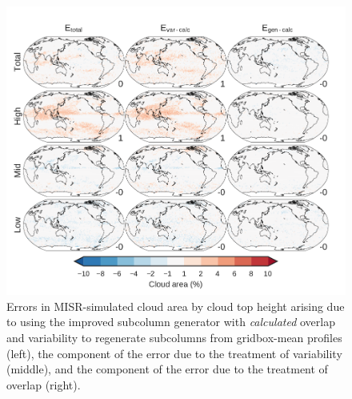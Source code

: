 \begin{figure}[htbp]
\centering
\includegraphics{graphics/subgrid2_cldmisr_maps_gen-var-calc_diff.pdf}
\caption{\label{fig:cldmisrMapsCalcDiff}Errors in MISR-simulated cloud
area by cloud top height arising due to using the improved subcolumn
generator with \emph{calculated} overlap and variability to regenerate
subcolumns from gridbox-mean profiles (left), the component of the error
due to the treatment of variability (middle), and the component of the
error due to the treatment of overlap
(right).}\label{fig:cldmisrMapsCalcDiff}
\end{figure}

